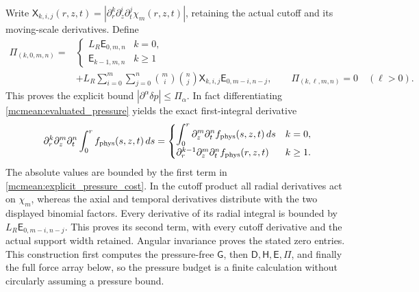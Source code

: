 \documentclass[11pt]{article}
\begin{document}
Write \(\mathsf X_{k,i,j}(r,z,t)
=|\partial_r^k\partial_z^i\partial_t^j\chi_m(r,z,t)|\), retaining
the actual cutoff and its moving-scale derivatives. Define
\begin{equation}\label{mcmean:explicit_pressure_cost}
\begin{split}
 \mathsf\Pi_{(k,0,m,n)}={}&
 \begin{cases}L_R\mathsf E_{0,m,n}&k=0,\\
               \mathsf E_{k-1,m,n}&k\ge1
 \end{cases}\\
 &+L_R\sum_{i=0}^m\sum_{j=0}^n\binom mi\binom nj
           \mathsf X_{k,i,j}\mathsf E_{0,m-i,n-j},
 \qquad \mathsf\Pi_{(k,\ell,m,n)}=0\quad(\ell>0).
\end{split}
\end{equation}
This proves the explicit bound
\(|\partial^\alpha\delta p|\le\mathsf\Pi_\alpha\).
In fact differentiating \eqref{mcmean:evaluated_pressure} yields
the exact first-integral derivative
\[
 \partial_r^k\partial_z^m\partial_t^n
       \int_0^r f_{\rm phys}(s,z,t)\,ds
 =\begin{cases}
   \displaystyle\int_0^r\partial_z^m\partial_t^n
                         f_{\rm phys}(s,z,t)\,ds&k=0,\\
   \partial_r^{k-1}\partial_z^m\partial_t^n f_{\rm phys}(r,z,t)&k\ge1.
  \end{cases}
\]
The absolute values are bounded by the first term in
\eqref{mcmean:explicit_pressure_cost}. In the cutoff product all
radial derivatives act on \(\chi_m\), whereas the axial and temporal
derivatives distribute with the two displayed binomial factors.
Every derivative of its radial integral is bounded by
\(L_R\mathsf E_{0,m-i,n-j}\). This proves its second term, with
every cutoff derivative and the actual support width retained.
Angular invariance proves the stated zero entries. This construction
first computes the pressure-free \(\mathsf G\), then
\(\mathsf D,\mathsf H,\mathsf E,\mathsf\Pi\), and finally the
full force array below, so the pressure budget is a finite calculation
without circularly assuming a pressure bound.
\end{document}
